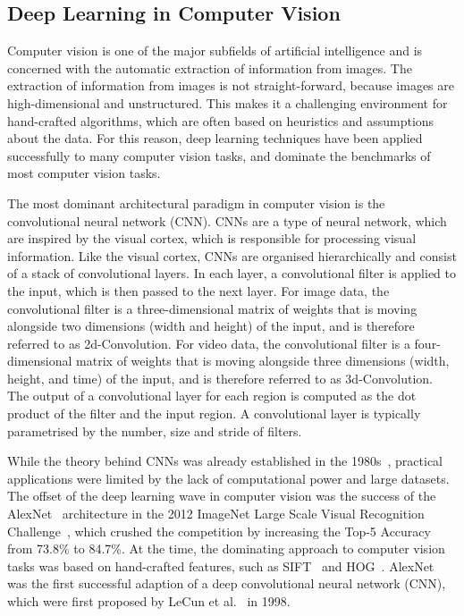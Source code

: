 \documentclass[a4paper]{article}
\begin{document}
  \subsection{Deep Learning in Computer Vision} %

  Computer vision is one of the major subfields of artificial intelligence and
  is concerned with the automatic extraction of information from images. The
  extraction of information from images is not straight-forward, because images
  are high-dimensional and unstructured. This makes it a challenging environment
  for hand-crafted algorithms, which are often based on heuristics and
  assumptions about the data. For this reason, deep learning techniques have
  been applied successfully to many computer vision tasks, and dominate the
  benchmarks of most computer vision tasks.

  The most dominant architectural paradigm in computer vision is the
  convolutional neural network (CNN). CNNs are a type of neural network, which
  are inspired by the visual cortex, which is responsible for processing visual
  information. Like the visual cortex, CNNs are organised hierarchically and
  consist of a stack of convolutional layers. In each layer, a convolutional
  filter is applied to the input, which is then passed to the next layer. For
  image data, the convolutional filter is a three-dimensional matrix of weights
  that is moving alongside two dimensions (width and height) of the input, and
  is therefore referred to as 2d-Convolution. For video data, the convolutional
  filter is a four-dimensional matrix of weights that is moving alongside three
  dimensions (width, height, and time) of the input, and is therefore referred
  to as 3d-Convolution. The output of a convolutional layer for each region is
  computed as the dot product of the filter and the input region. A
  convolutional layer is typically parametrised by the number, size and stride
  of filters.


  While the theory behind CNNs was already established in the
  1980s~\cite{lenet}, practical applications were limited by the lack of
  computational power and large datasets. The offset of the deep learning wave
  in computer vision was the success of the AlexNet~\cite{alexnet} architecture
  in the 2012 ImageNet Large Scale Visual Recognition Challenge~\cite{imagenet},
  which crushed the competition by increasing the Top-5 Accuracy from 73.8\% to
  84.7\%. At the time, the dominating approach to computer vision tasks was
  based on hand-crafted features, such as SIFT~\cite{sift} and HOG~\cite{hog}.
  AlexNet was the first successful adaption of a deep convolutional neural
  network (CNN), which were first proposed by LeCun et al.~\cite{lenet} in 1998. 
\end{document}
